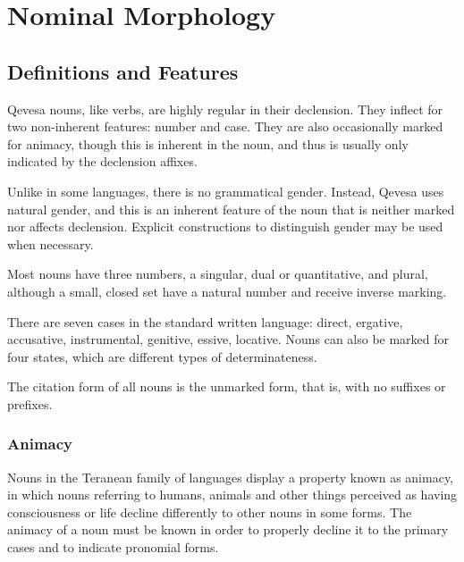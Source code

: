\documentclass[grammar]{subfiles}
\begin{document}
\chapter{Nominal Morphology}
\label{ch:nominal_morphology}


\section{Definitions and Features}
\label{sec:nm_definition_features}

Qevesa nouns, like verbs, are highly regular in their declension.  They
inflect for two non-inherent features: number and case.  They are also
occasionally marked for animacy, though this is inherent in the noun, and
thus is usually only indicated by the declension affixes. 

Unlike in some languages, there is no grammatical gender.  Instead, Qevesa
uses natural gender, and this is an inherent feature of the noun that is
neither marked nor affects declension.  Explicit constructions to distinguish
gender may be used when necessary.

Most nouns have three numbers, a singular, dual or quantitative, and plural,
although a small, closed set have a natural number and receive inverse
marking. 

There are seven cases in the standard written language: direct, ergative,
accusative, instrumental, genitive, essive, locative. 
%
Nouns can also be marked for four states, which are different types of determinateness.

The citation form of all nouns is the unmarked form, that is, with no suffixes or prefixes.


\subsection{Animacy}
\label{ssec:nm_animacy}

Nouns in the Teranean family of languages display a property known as animacy,
in which nouns referring to humans, animals and other things perceived as
having consciousness or life decline differently to other nouns in some
forms.  The animacy of a noun must be known in order to properly decline it
to the primary cases and to indicate pronomial forms.
\end{document}
